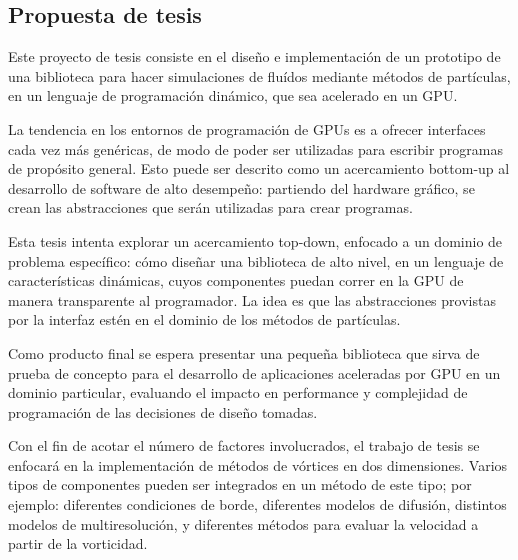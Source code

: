 \documentclass[11pt,spanish]{article}
\begin{document}
\subsection{Propuesta de tesis}

Este proyecto de tesis consiste en el diseño e implementación de un prototipo de
una biblioteca para hacer simulaciones de fluídos mediante métodos de
partículas, en un lenguaje de programación dinámico, que sea acelerado en un
GPU.







La tendencia en los entornos de programación de GPUs es a ofrecer interfaces
cada vez más genéricas, de modo de poder ser utilizadas para escribir programas
de propósito general.  Esto puede ser descrito como un acercamiento bottom-up
al desarrollo de software de alto desempeño:  partiendo del hardware gráfico,
se crean las abstracciones que serán utilizadas para crear programas.

Esta tesis intenta explorar un acercamiento top-down, enfocado a un dominio de
problema específico: cómo diseñar una biblioteca de alto nivel, en un lenguaje
de características dinámicas, cuyos componentes puedan correr en la GPU de
manera transparente al programador.  La idea es que las abstracciones provistas
por la interfaz estén en el dominio de los métodos de partículas.

Como producto final se espera presentar una pequeña biblioteca que sirva de
prueba de concepto para el desarrollo de aplicaciones aceleradas por GPU en un
dominio particular, evaluando el impacto en performance y complejidad de
programación de las decisiones de diseño tomadas.

Con el fin de acotar el número de factores involucrados, el trabajo de tesis se
enfocará en la implementación de métodos de vórtices en dos dimensiones.  Varios
tipos de componentes pueden ser integrados en un método de este tipo; por
ejemplo: diferentes condiciones de borde, diferentes modelos de difusión,
distintos modelos de multiresolución, y diferentes métodos para evaluar la
velocidad a partir de la vorticidad.
\end{document}
